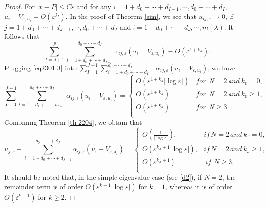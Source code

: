 \documentclass[11pt,reqno]{article}
\numberwithin{equation}{section}
\newcommand\e\varepsilon
\begin{document}
\begin{proof}
For $|x-P|\leq C\e$ and for any $i=1+d_0+\cdots+d_{I-1},\cdots,d_0+\cdots+d_I$, $u_i-V_{\e,u_i}=O(\e^{k_I})$. In the proof of Theorem \ref{sim}, we see that $\alpha_{lj,\e}\to 0$, if $j=1+d_0+\cdots+d_{J-1},\cdots,d_0+\cdots+d_J$ and $l=1+d_0+\cdots+d_J,\cdots,m(\lambda)$. It follows that
\begin{equation}
    \sum_{I=J+1}^{p}\sum_{i=1+d_0+\cdots+d_{I-1}}^{d_0+\cdots+d_I}\alpha_{ij,\e} (u_i-V_{\e,u_i})=O(\e^{1+k_J}).
\end{equation}
Plugging \eqref{eq2301-3} into $ \sum_{I=1}^{J-1}\sum_{i=1+d_0+\cdots+d_{I-1}}^{d_0+\cdots+d_I}\alpha_{ij,\e} (u_i-V_{\e,u_i})$,  we have
    \begin{equation}
      \sum_{I=1}^{J-1}\sum_{i=1+d_0+\cdots+d_{I-1}}^{d_0+\cdots+d_I}\alpha_{ij,\e} (u_i-V_{\e,u_i})
      = \begin{cases}
\displaystyle O(\e^{1+k_J}|\log\e|) &\ for \ \ N=2\ and\  k_0=0,\\
    \displaystyle O(\e^{1+k_J})&\ for \ \ N=2\ and\  k_0\ge 1,\\
     \displaystyle O(\e^{1+k_J})&\ for \ \ N\ge3.\\
    \end{cases}
\end{equation}
Combining Theorem \ref{th-2204}, we obtain that 
 \begin{equation}\label{eq1707}
      u_{j,\e}-\sum_{i=1+d_0+\cdots+d_{J-1}}^{d_0+\cdots+d_J}\alpha_{ij,\e} (u_i-V_{\e,u_i})=
      \begin{cases}
      \displaystyle O\left(\frac{1}{|\log\e|}\right),&if\ N=2\ and \ k_J=0,\\
      \displaystyle O(\e^{k_J+1}|\log\e|), &if \ N=2\ and \ k_J\ge 1,\\
       \displaystyle O(\e^{k_J+1})&\ if \ \ N\ge3.\\
      \end{cases}
 \end{equation}
     It should be noted that, in the simple-eigenvalue case (see \eqref{d2}), if $N=2$, the remainder term is of order $O(\e^{k+1}|\log\e|)$ for $k=1$, whereas it is of order $O(\e^{k+1})$ for $k\ge2$.
      


\end{proof}
\end{document}
